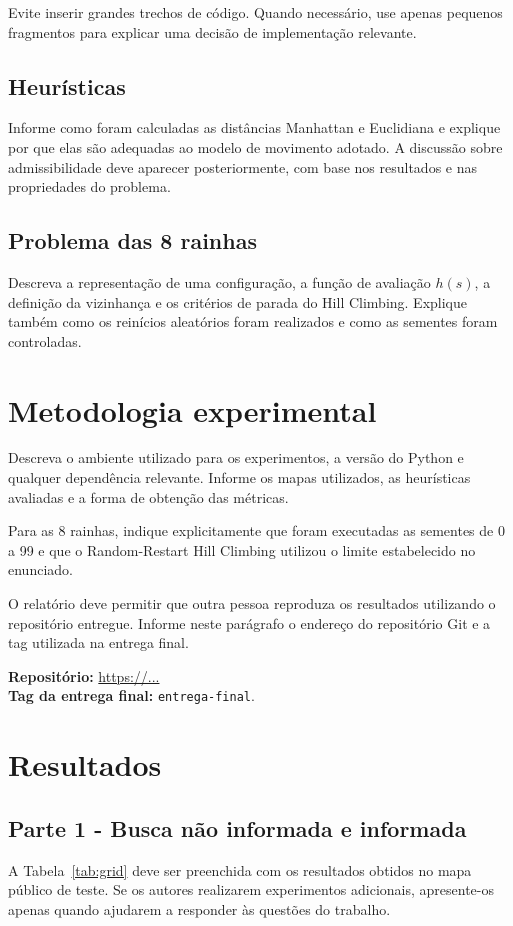 \documentclass[12pt]{article}
\begin{document}
Evite inserir grandes trechos de código. Quando necessário, use apenas pequenos fragmentos para explicar uma decisão de implementação relevante.

\subsection{Heurísticas}
Informe como foram calculadas as distâncias Manhattan e Euclidiana e explique por que elas são adequadas ao modelo de movimento adotado. A discussão sobre admissibilidade deve aparecer posteriormente, com base nos resultados e nas propriedades do problema.

\subsection{Problema das 8 rainhas}
Descreva a representação de uma configuração, a função de avaliação $h(s)$, a definição da vizinhança e os critérios de parada do Hill Climbing. Explique também como os reinícios aleatórios foram realizados e como as sementes foram controladas.

\section{Metodologia experimental}
Descreva o ambiente utilizado para os experimentos, a versão do Python e qualquer dependência relevante. Informe os mapas utilizados, as heurísticas avaliadas e a forma de obtenção das métricas.

Para as 8 rainhas, indique explicitamente que foram executadas as sementes de 0 a 99 e que o Random-Restart Hill Climbing utilizou o limite estabelecido no enunciado.

O relatório deve permitir que outra pessoa reproduza os resultados utilizando o repositório entregue. Informe neste parágrafo o endereço do repositório Git e a tag utilizada na entrega final.

\noindent\textbf{Repositório:} \url{https://...} \\
\textbf{Tag da entrega final:} \texttt{entrega-final}.

\section{Resultados}
\subsection{Parte 1 - Busca não informada e informada}
A Tabela~\ref{tab:grid} deve ser preenchida com os resultados obtidos no mapa público de teste. Se os autores realizarem experimentos adicionais, apresente-os apenas quando ajudarem a responder às questões do trabalho.
\end{document}
